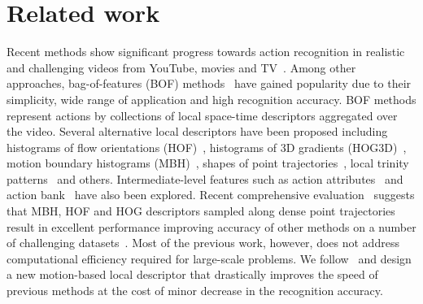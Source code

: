 \documentclass[10pt,twocolumn,letterpaper]{article}
\begin{document}
\section{Related work}
\label{sec:relatedwork}


Recent methods show significant progress towards action recognition in realistic and challenging videos from YouTube, movies and TV~\cite{Laptev08,Laptev07,Liu11,Niebles10,Rodriguez08,Sadanand12,Wang12}. 
Among other approaches, bag-of-features (BOF) methods~\cite{Dollar05,Laptev05,Schuldt04} have gained popularity due to their simplicity, wide range of application and high recognition accuracy.
BOF methods represent actions by collections of local space-time descriptors aggregated over the video. 
Several alternative local descriptors have been proposed including histograms of flow orientations (HOF)~\cite{Laptev08}, histograms of 3D gradients (HOG3D)~\cite{klaser2008spatio,Scovanner07}, motion boundary histograms (MBH)~\cite{Dalal06,Wang12}, shapes of point trajectories~\cite{Matikainen09,Messing09,Wang12}, local trinity patterns~\cite{Kliper12,Yeffet09} and others. Intermediate-level features such as action attributes~\cite{Liu11} and action bank~\cite{Sadanand12} have also been explored. Recent comprehensive evaluation~\cite{Wang12} suggests that MBH, HOF and HOG descriptors sampled along dense point trajectories result in excellent performance improving accuracy of other methods on a number of challenging datasets~\cite{Wang12}. Most of the previous work, however, does not address computational efficiency required for large-scale problems. We follow~\cite{Wang12} and design a new motion-based local descriptor that drastically improves the speed of previous methods at the cost of minor decrease in the recognition accuracy.

\end{document}
